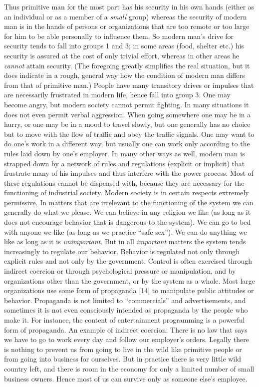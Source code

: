  Thus primitive man for the most part has his security in his own hands (either as an individual or as a member of a {\em small} group) whereas the security of modern man is in the hands of persons or organizations that are too remote or too large for him to be able personally to influence them. So modern man’s drive for security tends to fall into groups 1 and 3; in some areas (food, shelter etc.) his security is assured at the cost of only trivial effort, whereas in other areas he {\em cannot} attain security. (The foregoing greatly simplifies the real situation, but it does indicate in a rough, general way how the condition of modern man differs from that of primitive man.)
 People have many transitory drives or impulses that are necessarily frustrated in modern life, hence fall into group 3. One may become angry, but modern society cannot permit fighting. In many situations it does not even permit verbal aggression. When going somewhere one may be in a hurry, or one may be in a mood to travel slowly, but one generally has no choice but to move with the flow of traffic and obey the traffic signals. One may want to do one’s work in a different way, but usually one can work only according to the rules laid down by one’s employer. In many other ways as well, modern man is strapped down by a network of rules and regulations (explicit or implicit) that frustrate many of his impulses and thus interfere with the power process. Most of these regulations cannot be dispensed with, because they are necessary for the functioning of industrial society.
 Modern society is in certain respects extremely permissive. In matters that are irrelevant to the functioning of the system we can generally do what we please. We can believe in any religion we like (as long as it does not encourage behavior that is dangerous to the system). We can go to bed with anyone we like (as long as we practice “safe sex”). We can do anything we like as long as it is {\em unimportant}. But in all {\em important} matters the system tends increasingly to regulate our behavior.
 Behavior is regulated not only through explicit rules and not only by the government. Control is often exercised through indirect coercion or through psychological pressure or manipulation, and by organizations other than the government, or by the system as a whole. Most large organizations use some form of propaganda [14] to manipulate public attitudes or behavior. Propaganda is not limited to “commercials” and advertisements, and sometimes it is not even consciously intended as propaganda by the people who make it. For instance, the content of entertainment programming is a powerful form of propaganda. An example of indirect coercion: There is no law that says we have to go to work every day and follow our employer’s orders. Legally there is nothing to prevent us from going to live in the wild like primitive people or from going into business for ourselves. But in practice there is very little wild country left, and there is room in the economy for only a limited number of small business owners. Hence most of us can survive only as someone else’s employee.
